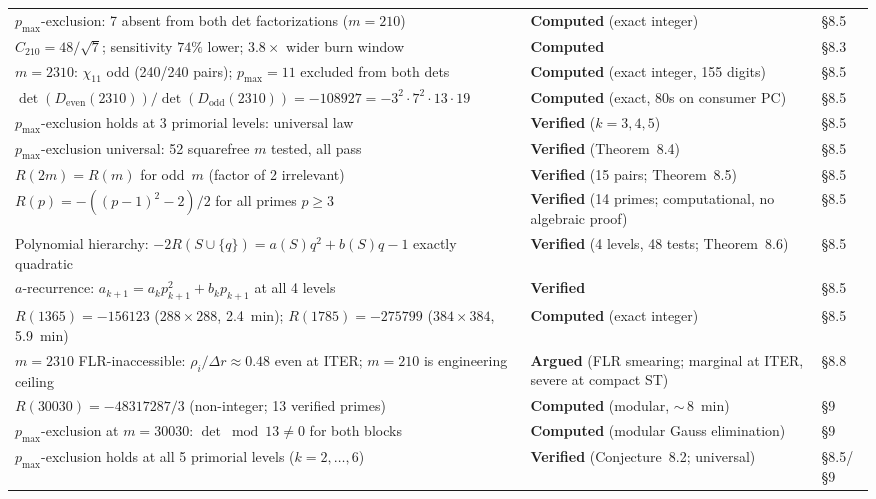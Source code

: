 \documentclass[11pt,letterpaper]{article}
\theoremstyle{definition}
\begin{document}
\begin{longtable}{@{}p{}p{}l@{}}
$p_{\text{max}}$-exclusion: 7 absent from both det factorizations ($m = 210$) & \textbf{Computed} (exact integer) & \S8.5 \\
$C_{210} = 48/\sqrt{7}$; sensitivity $74\%$ lower; $3.8\times$ wider burn window & \textbf{Computed} & \S8.3 \\
$m = 2310$: $\chi_{11}$ odd (240/240 pairs); $p_{\text{max}} = 11$ excluded from both dets & \textbf{Computed} (exact integer, 155 digits) & \S8.5 \\
$\det(D_{\text{even}}(2310))/\det(D_{\text{odd}}(2310)) = -108927 = -3^2 \cdot 7^2 \cdot 13 \cdot 19$ & \textbf{Computed} (exact, 80s on consumer PC) & \S8.5 \\
$p_{\text{max}}$-exclusion holds at 3 primorial levels: universal law & \textbf{Verified} ($k = 3, 4, 5$) & \S8.5 \\
$p_{\text{max}}$-exclusion universal: 52 squarefree $m$ tested, all pass & \textbf{Verified} (Theorem~8.4) & \S8.5 \\
$R(2m) = R(m)$ for odd~$m$ (factor of 2 irrelevant) & \textbf{Verified} (15 pairs; Theorem~8.5) & \S8.5 \\
$R(p) = -((p-1)^2 - 2)/2$ for all primes $p \geq 3$ & \textbf{Verified} (14 primes; computational, no algebraic proof) & \S8.5 \\
Polynomial hierarchy: $-2R(S \cup \{q\}) = a(S)q^2 + b(S)q - 1$ exactly quadratic & \textbf{Verified} (4 levels, 48 tests; Theorem~8.6) & \S8.5 \\
$a$-recurrence: $a_{k+1} = a_k p_{k+1}^2 + b_k p_{k+1}$ at all 4 levels & \textbf{Verified} & \S8.5 \\
$R(1365) = -156123$ ($288 \times 288$, 2.4~min); $R(1785) = -275799$ ($384 \times 384$, 5.9~min) & \textbf{Computed} (exact integer) & \S8.5 \\
$m = 2310$ FLR-inaccessible: $\rho_i / \Delta r \approx 0.48$ even at ITER; $m = 210$ is engineering ceiling & \textbf{Argued} (FLR smearing; marginal at ITER, severe at compact ST) & \S8.8 \\
$R(30030) = -48317287/3$ (non-integer; 13 verified primes) & \textbf{Computed} (modular, ${\sim}\,8$~min) & \S9 \\
$p_{\text{max}}$-exclusion at $m = 30030$: $\det \bmod 13 \neq 0$ for both blocks & \textbf{Computed} (modular Gauss elimination) & \S9 \\
$p_{\text{max}}$-exclusion holds at all 5 primorial levels ($k = 2, \ldots, 6$) & \textbf{Verified} (Conjecture~8.2; universal) & \S8.5/\S9 \\

\end{longtable}
\end{document}
